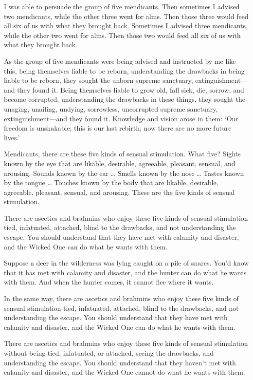 \documentclass[12pt,openany]{book}%
\begin{document}
I was able to persuade the group of five mendicants. Then sometimes I advised two mendicants, while the other three went for alms. Then those three would feed all six of us with what they brought back. Sometimes I advised three mendicants, while the other two went for alms. Then those two would feed all six of us with what they brought back. 

As the group of five mendicants were being advised and instructed by me like this, being themselves liable to be reborn, understanding the drawbacks in being liable to be reborn, they sought the unborn supreme sanctuary, extinguishment—and they found it. Being themselves liable to grow old, fall sick, die, sorrow, and become corrupted, understanding the drawbacks in these things, they sought the unaging, unailing, undying, sorrowless, uncorrupted supreme sanctuary, extinguishment—and they found it. Knowledge and vision arose in them: ‘Our freedom is unshakable; this is our last rebirth; now there are no more future lives.’ 

Mendicants, there are these five kinds of sensual stimulation. What five? Sights known by the eye that are likable, desirable, agreeable, pleasant, sensual, and arousing. Sounds known by the ear … Smells known by the nose … Tastes known by the tongue … Touches known by the body that are likable, desirable, agreeable, pleasant, sensual, and arousing. These are the five kinds of sensual stimulation. 

There are ascetics and brahmins who enjoy these five kinds of sensual stimulation tied, infatuated, attached, blind to the drawbacks, and not understanding the escape. You should understand that they have met with calamity and disaster, and the Wicked One can do what he wants with them. 

Suppose a deer in the wilderness was lying caught on a pile of snares. You’d know that it has met with calamity and disaster, and the hunter can do what he wants with them. And when the hunter comes, it cannot flee where it wants. 

In the same way, there are ascetics and brahmins who enjoy these five kinds of sensual stimulation tied, infatuated, attached, blind to the drawbacks, and not understanding the escape. You should understand that they have met with calamity and disaster, and the Wicked One can do what he wants with them. 

There are ascetics and brahmins who enjoy these five kinds of sensual stimulation without being tied, infatuated, or attached, seeing the drawbacks, and understanding the escape. You should understand that they haven’t met with calamity and disaster, and the Wicked One cannot do what he wants with them. 
\end{document}
